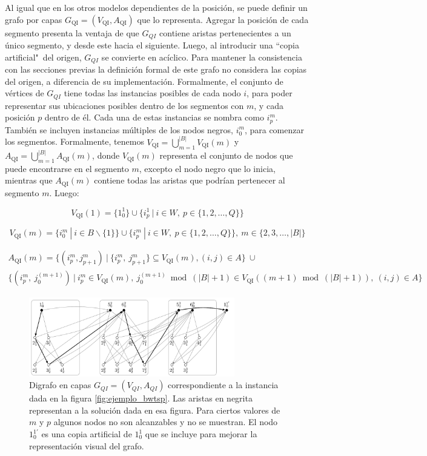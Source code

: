 \documentclass[10pt, a4paper]{article}
\theoremstyle{definition}
\begin{document}
Al igual que en los otros modelos dependientes de la posición, se puede definir un grafo por capas $G_{\mathrm{QI}}=\left(V_{\mathrm{QI}}, A_{\mathrm{QI}}\right)$ que lo representa. Agregar la posición de cada segmento presenta la ventaja de que $G_{QI}$ contiene aristas pertenecientes a un único segmento, y desde este hacia el siguiente. Luego, al introducir una “copia artificial"\ del origen, $G_{QI}$ se convierte en acíclico. Para mantener la consistencia con las secciones previas la definición formal de este grafo no considera las copias del origen, a diferencia de su implementación. Formalmente, el conjunto de vértices de $G_{QI}$ tiene todas las instancias posibles de cada nodo $i$, para poder representar sus ubicaciones posibles dentro de los segmentos con $m$, y cada posición $p$ dentro de él. Cada una de estas instancias se nombra como $i_{p}^{m}$. También se incluyen instancias múltiples de los nodos negros, $i_{0}^{m}$, para comenzar los segmentos. Formalmente, tenemos $V_{\mathrm{QI}}=\bigcup_{m=1}^{|B|} V_{\mathrm{QI}}(m)$ y $A_{\mathrm{QI}}=\bigcup_{m=1}^{|B|} A_{\mathrm{QI}}(m)$, donde $V_{\mathrm{QI}}(m)$ representa el conjunto de nodos que puede encontrarse en el segmento $m$, excepto el nodo negro que lo inicia, mientras que $A_{\mathrm{QI}}(m)$ contiene todas las aristas que podrían pertenecer al segmento $m$. Luego:

$$V_{\mathrm{QI}}(1)=\{1_{0}^{1}\} \cup\{i_{p}^{1}\ |\  i \in W,\ p \in\{1,2, \ldots, Q\} \}$$

$$V_{\mathrm{QI}}(m)=\{i_{0}^{m}\ |\ i \in B \backslash\{1\}\} \cup\{i_{p}^{m}\ |\ i \in W,\ p \in\{1,2, \ldots, Q\}\},\ m \in \{2,3, \ldots,|B|\}$$


\begin{multline*}
	A_{\mathrm{QI}}(m)=\{(i_{p}^{m}, j_{p+1}^{m})\ |\ \{i_{p}^{m},\ j_{p+1}^{m}\} \subseteq V_{\mathrm{QI}}(m),(i, j) \in A\}\ \cup \\ \{(i_{p}^{m},\ j_{0}^{(m+1)})\ |\  i_{p}^{m} \in V_{\mathrm{QI}}(m),\ j_{0}^{(m+1)} \bmod (|B|+1) \in V_{\mathrm{QI}}((m+1) \bmod (|B|+1)),\ (i, j) \in A \}
\end{multline*}

\begin{figure}[H]
  \centering
  \includegraphics[width=0.8\textwidth]{ejemplo_capas_qi.png}
  \caption{Digrafo en capas $G_{QI}=(V_{QI}, A_{QI})$ correspondiente a la instancia dada en la figura \ref{fig:ejemplo_bwtsp}. Las aristas en negrita representan a la solución dada en esa figura. Para ciertos valores de $m$ y $p$ algunos nodos no son alcanzables y no se muestran. El nodo $1_{0}^{1 \prime}$ es una copia artificial de $1_{0}^{1}$ que se incluye para mejorar la representación visual del grafo.}
  \label{fig:ejemplo_capas_qi}
\end{figure}
\end{document}
